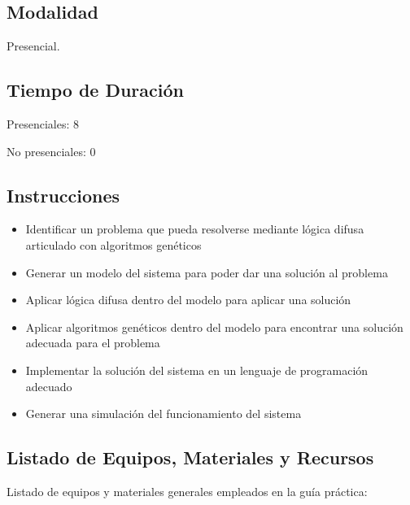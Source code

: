 \documentclass[11pt]{article}
\begin{document}
\subsection{Modalidad}

Presencial.

\subsection{Tiempo de Duración}

Presenciales: 8

No presenciales: 0

\subsection{Instrucciones}

\begin{itemize}
    \item Identificar un problema que pueda resolverse mediante l\'ogica difusa articulado con algoritmos gen\'eticos
    \item Generar un modelo del sistema para poder dar una soluci\'on al problema
    \item Aplicar l\'ogica difusa dentro del modelo para aplicar una soluci\'on
    \item Aplicar algoritmos gen\'eticos dentro del modelo para encontrar una soluci\'on adecuada para el problema
    \item Implementar la soluci\'on del sistema en un lenguaje de programaci\'on adecuado
    \item Generar una simulaci\'on del funcionamiento del sistema
\end{itemize}

\subsection{Listado de Equipos, Materiales y Recursos}

Listado de equipos y materiales generales empleados en la gu\'ia pr\'actica:
\end{document}
